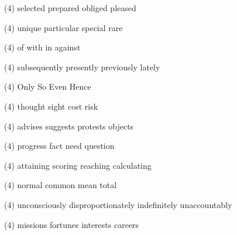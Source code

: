\item
\begin{tasks}(4)
	\task selected
	\task prepared
	\task obliged
	\task pleased
\end{tasks}
\item
\begin{tasks}(4)
	\task unique
	\task particular
	\task special
	\task rare
\end{tasks}
\item
\begin{tasks}(4)
	\task of
	\task with
	\task in
	\task against
\end{tasks}
\item
\begin{tasks}(4)
	\task subsequently
	\task presently
	\task previously
	\task lately
\end{tasks}
\item
\begin{tasks}(4)
	\task Only
	\task So
	\task Even
	\task Hence
\end{tasks}
\item
\begin{tasks}(4)
	\task thought
	\task sight
	\task cost
	\task risk
\end{tasks}
\item
\begin{tasks}(4)
	\task advises
	\task suggests
	\task protests
	\task objects
\end{tasks}
\item
\begin{tasks}(4)
	\task progress
	\task fact
	\task need
	\task question
\end{tasks}
\item
\begin{tasks}(4)
	\task attaining
	\task scoring
	\task reaching
	\task calculating
\end{tasks}
\item
\begin{tasks}(4)
	\task normal
	\task common
	\task mean
	\task total
\end{tasks}
\item
\begin{tasks}(4)
	\task unconsciously
	\task disproportionately
	\task indefinitely
	\task unaccountably
\end{tasks}
\item
\begin{tasks}(4)
	\task missions
	\task fortunes
	\task interests
	\task careers
\end{tasks}
\item
